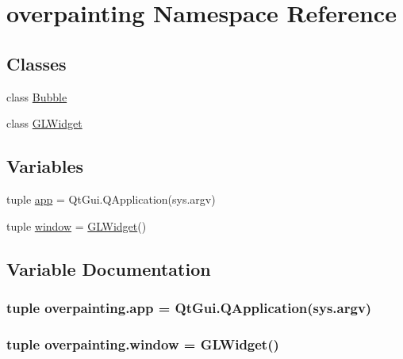\hypertarget{namespaceoverpainting}{}\section{overpainting Namespace Reference}
\label{namespaceoverpainting}
\subsection*{Classes}
\begin{DoxyCompactItemize}
\item 
class \hyperlink{classoverpainting_1_1Bubble}{Bubble}
\item 
class \hyperlink{classoverpainting_1_1GLWidget}{G\+L\+Widget}
\end{DoxyCompactItemize}
\subsection*{Variables}
\begin{DoxyCompactItemize}
\item 
tuple \hyperlink{namespaceoverpainting_ac923cbd37ba933e00b8252084abe6019}{app} = Qt\+Gui.\+Q\+Application(sys.\+argv)
\item 
tuple \hyperlink{namespaceoverpainting_a20f09b8941bc9904ccffa847a8190ff2}{window} = \hyperlink{classoverpainting_1_1GLWidget}{G\+L\+Widget}()
\end{DoxyCompactItemize}


\subsection{Variable Documentation}
\hypertarget{namespaceoverpainting_ac923cbd37ba933e00b8252084abe6019}{}
\subsubsection[{app}]{\setlength{\rightskip}{0pt plus 5cm}tuple overpainting.\+app = Qt\+Gui.\+Q\+Application(sys.\+argv)}\label{namespaceoverpainting_ac923cbd37ba933e00b8252084abe6019}
\hypertarget{namespaceoverpainting_a20f09b8941bc9904ccffa847a8190ff2}{}
\subsubsection[{window}]{\setlength{\rightskip}{0pt plus 5cm}tuple overpainting.\+window = {\bf G\+L\+Widget}()}\label{namespaceoverpainting_a20f09b8941bc9904ccffa847a8190ff2}
